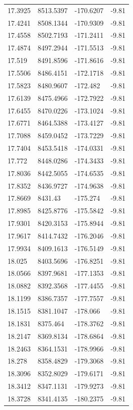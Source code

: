 \begin{table}[H]
\begin{tabular}{llll}
17.3925 & 8513.5397 & -170.6207 & -9.81 \\
17.4241 & 8508.1344 & -170.9309 & -9.81 \\
17.4558 & 8502.7193 & -171.2411 & -9.81 \\
17.4874 & 8497.2944 & -171.5513 & -9.81 \\
17.519 & 8491.8596 & -171.8616 & -9.81 \\
17.5506 & 8486.4151 & -172.1718 & -9.81 \\
17.5823 & 8480.9607 & -172.482 & -9.81 \\
17.6139 & 8475.4966 & -172.7922 & -9.81 \\
17.6455 & 8470.0226 & -173.1024 & -9.81 \\
17.6771 & 8464.5388 & -173.4127 & -9.81 \\
17.7088 & 8459.0452 & -173.7229 & -9.81 \\
17.7404 & 8453.5418 & -174.0331 & -9.81 \\
17.772 & 8448.0286 & -174.3433 & -9.81 \\
17.8036 & 8442.5055 & -174.6535 & -9.81 \\
17.8352 & 8436.9727 & -174.9638 & -9.81 \\
17.8669 & 8431.43 & -175.274 & -9.81 \\
17.8985 & 8425.8776 & -175.5842 & -9.81 \\
17.9301 & 8420.3153 & -175.8944 & -9.81 \\
17.9617 & 8414.7432 & -176.2046 & -9.81 \\
17.9934 & 8409.1613 & -176.5149 & -9.81 \\
18.025 & 8403.5696 & -176.8251 & -9.81 \\
18.0566 & 8397.9681 & -177.1353 & -9.81 \\
18.0882 & 8392.3568 & -177.4455 & -9.81 \\
18.1199 & 8386.7357 & -177.7557 & -9.81 \\
18.1515 & 8381.1047 & -178.066 & -9.81 \\
18.1831 & 8375.464 & -178.3762 & -9.81 \\
18.2147 & 8369.8134 & -178.6864 & -9.81 \\
18.2463 & 8364.1531 & -178.9966 & -9.81 \\
18.278 & 8358.4829 & -179.3068 & -9.81 \\
18.3096 & 8352.8029 & -179.6171 & -9.81 \\
18.3412 & 8347.1131 & -179.9273 & -9.81 \\
18.3728 & 8341.4135 & -180.2375 & -9.81 \\

\end{tabular}
\end{table}
